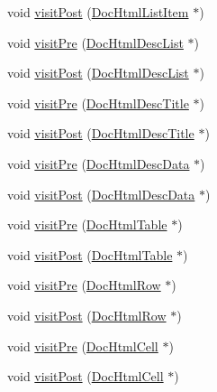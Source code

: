 \begin{DoxyCompactItemize}
void \hyperlink{class_perl_mod_doc_visitor_aca8e9ddda7fbd4df74bb9373b68599c5}{visit\+Post} (\hyperlink{class_doc_html_list_item}{Doc\+Html\+List\+Item} $\ast$)
\item 
void \hyperlink{class_perl_mod_doc_visitor_ab7af9e44ad25a6494a5917881ea7a3b0}{visit\+Pre} (\hyperlink{class_doc_html_desc_list}{Doc\+Html\+Desc\+List} $\ast$)
\item 
void \hyperlink{class_perl_mod_doc_visitor_aa186be88d0c1c07ef0f216e49749dd88}{visit\+Post} (\hyperlink{class_doc_html_desc_list}{Doc\+Html\+Desc\+List} $\ast$)
\item 
void \hyperlink{class_perl_mod_doc_visitor_af1300e4286a03e9c48ff4f5508219b14}{visit\+Pre} (\hyperlink{class_doc_html_desc_title}{Doc\+Html\+Desc\+Title} $\ast$)
\item 
void \hyperlink{class_perl_mod_doc_visitor_aef829d837e3f8cc38dd5b7ad4994ad8b}{visit\+Post} (\hyperlink{class_doc_html_desc_title}{Doc\+Html\+Desc\+Title} $\ast$)
\item 
void \hyperlink{class_perl_mod_doc_visitor_a98f5f7cd175eeba107f43b329d964979}{visit\+Pre} (\hyperlink{class_doc_html_desc_data}{Doc\+Html\+Desc\+Data} $\ast$)
\item 
void \hyperlink{class_perl_mod_doc_visitor_a588446a7f00e7b167fe5b8458496b34c}{visit\+Post} (\hyperlink{class_doc_html_desc_data}{Doc\+Html\+Desc\+Data} $\ast$)
\item 
void \hyperlink{class_perl_mod_doc_visitor_ad6a82378d9312cfb2ad7b339b1208353}{visit\+Pre} (\hyperlink{class_doc_html_table}{Doc\+Html\+Table} $\ast$)
\item 
void \hyperlink{class_perl_mod_doc_visitor_a361f1e7028f3b62106a785a282ac2cd7}{visit\+Post} (\hyperlink{class_doc_html_table}{Doc\+Html\+Table} $\ast$)
\item 
void \hyperlink{class_perl_mod_doc_visitor_a3ddfaaee96d2d6664c2f1b269781d235}{visit\+Pre} (\hyperlink{class_doc_html_row}{Doc\+Html\+Row} $\ast$)
\item 
void \hyperlink{class_perl_mod_doc_visitor_a80403cd740f564f97cf959e0847b021d}{visit\+Post} (\hyperlink{class_doc_html_row}{Doc\+Html\+Row} $\ast$)
\item 
void \hyperlink{class_perl_mod_doc_visitor_a01d6c4fb9ecb9bfcb09f1595f70f5190}{visit\+Pre} (\hyperlink{class_doc_html_cell}{Doc\+Html\+Cell} $\ast$)
\item 
void \hyperlink{class_perl_mod_doc_visitor_a5c1e9306b80bc8c1299bb2e3365cec79}{visit\+Post} (\hyperlink{class_doc_html_cell}{Doc\+Html\+Cell} $\ast$)
\item 

\end{DoxyCompactItemize}
